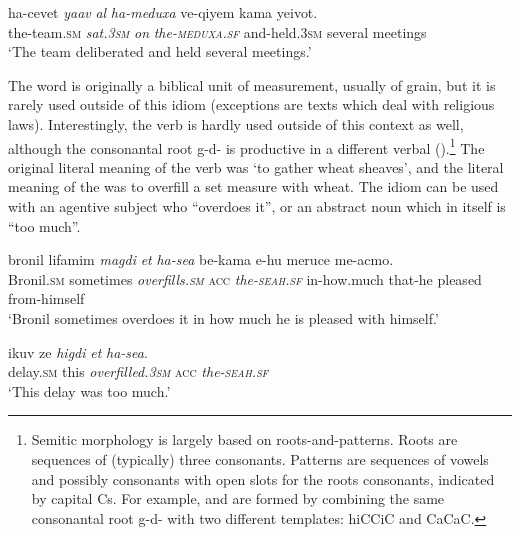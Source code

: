 \documentclass[output=paper]{langsci/langscibook}
\begin{document}
	\ea\label{she:meduxa-canon}
    	\gll ha-cevet \textit{ya{\shin}av} \textit{{\ayin}al} \textit{ha-meduxa} ve-qiyem kama ye{\shin}ivot.\\
    	   the-team.\textsc{sm} \textit{sat.\textsc{3sm}} \textit{on} \textit{the-\textsc{meduxa}.\textsc{sf}} and-held.\textsc{3sm} several meetings\\
    	\glt `The team deliberated and held several meetings.'
	\z

\noindent{} The word  is originally a biblical unit of measurement, usually of grain, but it is rarely used outside of this idiom (exceptions are texts which deal with religious laws). Interestingly, the verb  is hardly used outside of this context as well, although the consonantal root g-d-{\shin} is productive in a different verbal  ().\footnote{Semitic morphology is largely based on roots-and-patterns. Roots are sequences of (typically) three consonants. Patterns are sequences of vowels and possibly consonants with open slots for the roots consonants, indicated by capital Cs. For example,  and  are formed by combining the same consonantal root  g-d-{\shin} with two different templates: hiCCiC and CaCaC.} The original literal meaning of the verb  was `to gather wheat sheaves', and the literal meaning of the  was to overfill a set measure with wheat. The idiom can be used with an agentive subject  who ``overdoes it'', or an abstract noun  which in itself is ``too much''.

 	\ea\label{she:seah-canon1}
     	\gll bronil lif{\ayin}amim \textit{magdi{\shin}} \textit{{\alef}et} \textit{ha-se{\alef}a} be-kama {\shin}e-hu meruce me-{\ayin}acmo.\\
     	  Bronil.\textsc{sm} sometimes \textit{overfills.\textsc{sm}} \textsc{acc} \textit{the-\textsc{seah}.\textsc{sf}} in-how.much that-he pleased from-himself\\
     	\glt `Bronil sometimes overdoes it in how much he is pleased with himself.'
 	\z

 	\ea\label{she:seah-canon2}
     	\gll {\ayin}ikuv ze \textit{higdi{\shin}} \textit{{\alef}et} \textit{ha-se{\alef}a}.\\
     	  delay.\textsc{sm} this \textit{overfilled.\textsc{3sm}} \textsc{acc} \textit{the-\textsc{seah}.\textsc{sf}}\\
     	\glt `This delay was too much.'
 	\z
\end{document}
